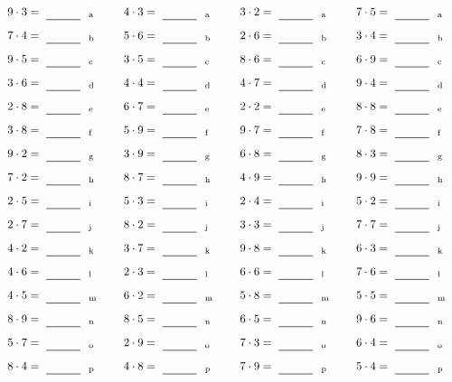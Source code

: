\documentclass
[
  draft    = true,
  fontsize = 11pt,
  parskip  = half-
]
{scrartcl}
\begin{document}
\par\vfill\par
\begin{align*}
    \pline{9\cdot3}&=\rline{a}
  & \pline{4\cdot3}&=\rline{a}
  & \pline{3\cdot2}&=\rline{a}
  & \pline{7\cdot5}&=\rline{a} \\[1ex]
    \pline{7\cdot4}&=\rline{b}
  & \pline{5\cdot6}&=\rline{b}
  & \pline{2\cdot6}&=\rline{b}
  & \pline{3\cdot4}&=\rline{b} \\[1ex]
    \pline{9\cdot5}&=\rline{c}
  & \pline{3\cdot5}&=\rline{c}
  & \pline{8\cdot6}&=\rline{c}
  & \pline{6\cdot9}&=\rline{c} \\[1ex]
    \pline{3\cdot6}&=\rline{d}
  & \pline{4\cdot4}&=\rline{d}
  & \pline{4\cdot7}&=\rline{d}
  & \pline{9\cdot4}&=\rline{d} \\[1ex]
    \pline{2\cdot8}&=\rline{e}
  & \pline{6\cdot7}&=\rline{e}
  & \pline{2\cdot2}&=\rline{e}
  & \pline{8\cdot8}&=\rline{e} \\[1ex]
    \pline{3\cdot8}&=\rline{f}
  & \pline{5\cdot9}&=\rline{f}
  & \pline{9\cdot7}&=\rline{f}
  & \pline{7\cdot8}&=\rline{f} \\[1ex]
    \pline{9\cdot2}&=\rline{g}
  & \pline{3\cdot9}&=\rline{g}
  & \pline{6\cdot8}&=\rline{g}
  & \pline{8\cdot3}&=\rline{g} \\[1ex]
    \pline{7\cdot2}&=\rline{h}
  & \pline{8\cdot7}&=\rline{h}
  & \pline{4\cdot9}&=\rline{h}
  & \pline{9\cdot9}&=\rline{h} \\[1ex]
    \pline{2\cdot5}&=\rline{i}
  & \pline{5\cdot3}&=\rline{i}
  & \pline{2\cdot4}&=\rline{i}
  & \pline{5\cdot2}&=\rline{i} \\[1ex]
    \pline{2\cdot7}&=\rline{j}
  & \pline{8\cdot2}&=\rline{j}
  & \pline{3\cdot3}&=\rline{j}
  & \pline{7\cdot7}&=\rline{j} \\[1ex]
    \pline{4\cdot2}&=\rline{k}
  & \pline{3\cdot7}&=\rline{k}
  & \pline{9\cdot8}&=\rline{k}
  & \pline{6\cdot3}&=\rline{k} \\[1ex]
    \pline{4\cdot6}&=\rline{l}
  & \pline{2\cdot3}&=\rline{l}
  & \pline{6\cdot6}&=\rline{l}
  & \pline{7\cdot6}&=\rline{l} \\[1ex]
    \pline{4\cdot5}&=\rline{m}
  & \pline{6\cdot2}&=\rline{m}
  & \pline{5\cdot8}&=\rline{m}
  & \pline{5\cdot5}&=\rline{m} \\[1ex]
    \pline{8\cdot9}&=\rline{n}
  & \pline{8\cdot5}&=\rline{n}
  & \pline{6\cdot5}&=\rline{n}
  & \pline{9\cdot6}&=\rline{n} \\[1ex]
    \pline{5\cdot7}&=\rline{o}
  & \pline{2\cdot9}&=\rline{o}
  & \pline{7\cdot3}&=\rline{o}
  & \pline{6\cdot4}&=\rline{o} \\[1ex]
    \pline{8\cdot4}&=\rline{p}
  & \pline{4\cdot8}&=\rline{p}
  & \pline{7\cdot9}&=\rline{p}
  & \pline{5\cdot4}&=\rline{p}
\end{align*}
\end{document}
